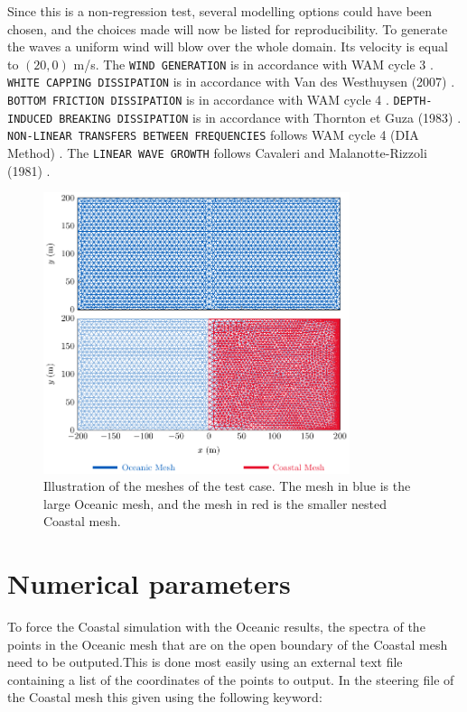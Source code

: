 Since this is a non-regression test, several modelling options could have been
chosen, and the choices made will now be listed for reproducibility. To
generate the waves a uniform wind will blow over the whole domain. Its velocity
is equal to $(20,0)$ m/s. The \texttt{WIND GENERATION} is in accordance with
WAM cycle 3 \citep{Snyder1981}. \texttt{WHITE CAPPING DISSIPATION} is in
accordance with Van des Westhuysen (2007) \citep{Westhuys2007}. \texttt{BOTTOM
  FRICTION DISSIPATION} is in accordance with WAM cycle 4
\citep{Hasselmann1973,Bouws1983}. \texttt{DEPTH-INDUCED BREAKING DISSIPATION}
is in accordance with Thornton et Guza  (1983) \citep{Thornton1983}.
\texttt{NON-LINEAR TRANSFERS BETWEEN FREQUENCIES} follows WAM cycle 4 (DIA
Method) \citep{Hasselmann1985_1}. The \texttt{LINEAR WAVE GROWTH} follows
Cavaleri and Malanotte-Rizzoli (1981) \citep{Cavaleri1981,Tolman1992}.

\begin{figure}[H]
\begin{center}
	\includegraphics[width=0.8\textwidth]{./Figures/MeshIllustration.pdf}
\end{center}
\caption{Illustration of the meshes of the test case. The mesh in
  {\color{EdfBlue} blue} is the large
  Oceanic mesh, and the mesh in {\color{PantoneRed} red} is the smaller nested
  Coastal mesh.}
\label{fig:impose_spectra_meshes}
\end{figure}
%

%
%
\section{Numerical parameters}
%
To force the Coastal simulation with the Oceanic results, the spectra of the
points in the Oceanic mesh that are on the open boundary of the Coastal mesh
need to be outputed.This is done most easily using an external text file
containing a list of the coordinates of the points to output. In the steering
file of the Coastal mesh this given using the following keyword:

